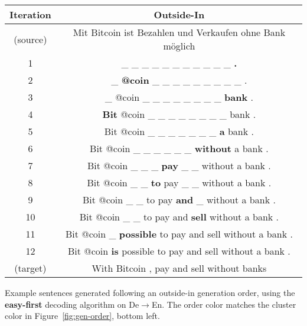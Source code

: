 \centering
\footnotesize
\begin{tabular}{cc}
\toprule
Iteration & {\color{orange} Outside-In} \\
\midrule
(source) & Mit Bitcoin ist Bezahlen und Verkaufen ohne Bank möglich \\
1 &  \_ \_ \_ \_ \_ \_ \_ \_ \_ \_ \_ \textbf{.} \\ 
2 &  \_ \textbf{@coin} \_ \_ \_ \_ \_ \_ \_ \_ \_ . \\ 
3 &  \_ @coin \_ \_ \_ \_ \_ \_ \_ \_ \textbf{bank} . \\ 
4 & \textbf{Bit} @coin \_ \_ \_ \_ \_ \_ \_ \_ bank . \\ 
5 & Bit @coin \_ \_ \_ \_ \_ \_ \_ \textbf{a} bank . \\ 
6 & Bit @coin \_ \_ \_ \_ \_ \_ \textbf{without} a bank . \\ 
7 & Bit @coin \_ \_ \_ \textbf{pay} \_ \_ without a bank . \\ 
8 & Bit @coin \_ \_ \textbf{to} pay \_ \_ without a bank . \\ 
9 & Bit @coin \_ \_ to pay \textbf{and} \_ without a bank . \\ 
10 & Bit @coin \_ \_ to pay and \textbf{sell} without a bank . \\ 
11 & Bit @coin \_ \textbf{possible} to pay and sell without a bank . \\ 
12 & Bit @coin \textbf{is} possible to pay and sell without a bank . \\
(target) & With Bitcoin , pay and sell without banks \\

\bottomrule
\end{tabular}

\caption{Example sentences generated following an {\color{orange} outside-in} generation order, using the \textbf{easy-first} decoding algorithm on De$\rightarrow$En. The order color matches the cluster color in Figure~\ref{fig:gen-order}, bottom left.}
